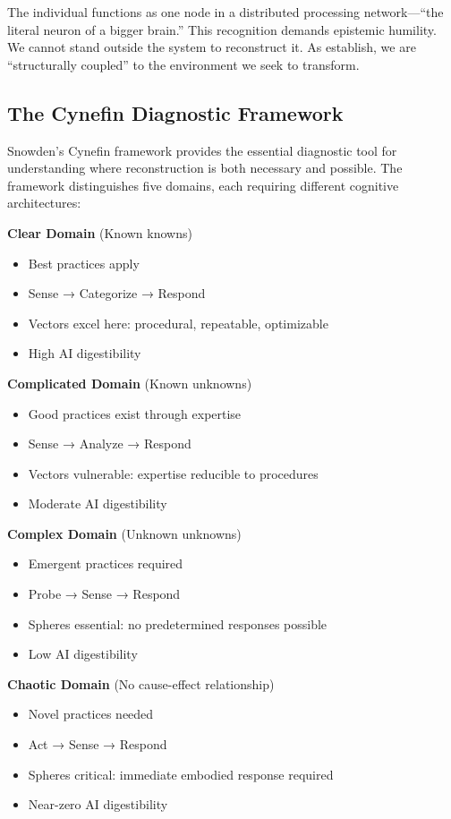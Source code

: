 The individual functions as one node in a distributed processing network---``the literal neuron of a bigger brain.'' This recognition demands epistemic humility. We cannot stand outside the system to reconstruct it. As \citet{maturana1987} establish, we are ``structurally coupled'' to the environment we seek to transform.

\subsection{The Cynefin Diagnostic Framework}

Snowden's Cynefin framework \citep{snowden2007} provides the essential diagnostic tool for understanding where reconstruction is both necessary and possible. The framework distinguishes five domains, each requiring different cognitive architectures:

\textbf{Clear Domain} (Known knowns)
\begin{itemize}
\item Best practices apply
\item Sense → Categorize → Respond
\item Vectors excel here: procedural, repeatable, optimizable
\item High AI digestibility
\end{itemize}

\textbf{Complicated Domain} (Known unknowns)
\begin{itemize}
\item Good practices exist through expertise
\item Sense → Analyze → Respond
\item Vectors vulnerable: expertise reducible to procedures
\item Moderate AI digestibility
\end{itemize}

\textbf{Complex Domain} (Unknown unknowns)
\begin{itemize}
\item Emergent practices required
\item Probe → Sense → Respond
\item Spheres essential: no predetermined responses possible
\item Low AI digestibility
\end{itemize}

\textbf{Chaotic Domain} (No cause-effect relationship)
\begin{itemize}
\item Novel practices needed
\item Act → Sense → Respond
\item Spheres critical: immediate embodied response required
\item Near-zero AI digestibility
\end{itemize}

